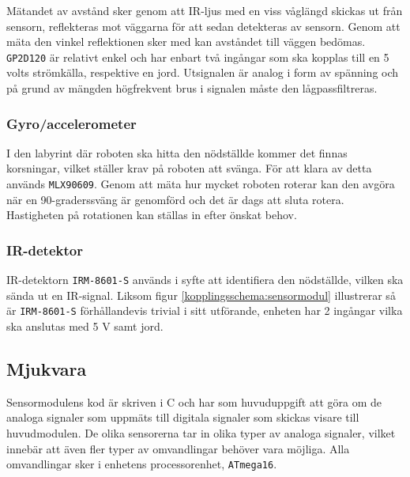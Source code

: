 \documentclass[11pt]{article}
\begin{document}
\begin{flushleft}
Mätandet av avstånd sker genom att IR-ljus med en viss våglängd skickas ut från sensorn, reflekteras mot väggarna för att sedan detekteras av sensorn. Genom att mäta den vinkel reflektionen sker med kan avståndet till väggen bedömas. \verb+GP2D120+ är relativt enkel och har enbart två ingångar som ska kopplas till en 5 volts strömkälla, respektive en jord.  Utsignalen är analog i form av spänning och på grund av mängden högfrekvent brus i signalen måste den lågpassfiltreras.

\subsubsection{Gyro/accelerometer}
I den labyrint där roboten ska hitta den nödställde kommer det finnas korsningar, vilket ställer krav på roboten att svänga. För att klara av detta används \verb+MLX90609+. Genom att mäta hur mycket roboten roterar kan den avgöra när en 90-graderssväng är genomförd och det är dags att sluta rotera. Hastigheten på rotationen kan ställas in efter önskat behov.



 
\subsubsection{IR-detektor}
IR-detektorn \verb+IRM-8601-S+ används i syfte att identifiera den nödställde, vilken ska sända ut en IR-signal. Liksom figur \ref{kopplingsschema:sensormodul} illustrerar så är \verb+IRM-8601-S+ förhållandevis trivial i sitt utförande, enheten har 2 ingångar vilka ska anslutas med 5 V samt jord. 




\subsection{Mjukvara}
Sensormodulens kod är skriven i C och har som huvuduppgift att göra om de analoga signaler som uppmäts till digitala signaler som skickas visare till huvudmodulen. De olika sensorerna tar in olika typer av analoga signaler, vilket innebär att även fler typer av omvandlingar behöver vara möjliga. Alla omvandlingar sker i enhetens processorenhet, \verb+ATmega16+. 


\end{flushleft}
\end{document}

